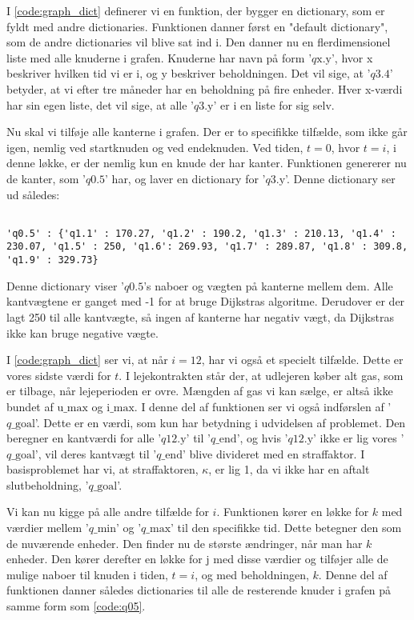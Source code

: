 I \autoref{code:graph_dict} definerer vi en funktion, der bygger en dictionary, som er fyldt med andre dictionaries. Funktionen danner først en "default dictionary", som de andre dictionaries vil blive sat ind i.
Den danner nu en flerdimensionel liste med alle knuderne i grafen. Knuderne har navn på form '$q\textrm{x.y}$', hvor x beskriver hvilken tid vi er i, og y beskriver beholdningen. Det vil sige, at '$q3.4$' betyder, at vi efter tre måneder har en beholdning på fire enheder. Hver x-værdi har sin egen liste, det vil sige, at alle '$q\textrm{3.y}$' er i en liste for sig selv.

Nu skal vi tilføje alle kanterne i grafen. Der er to specifikke tilfælde, som ikke går igen, nemlig ved startknuden og ved endeknuden. Ved tiden, $t=0$, hvor $t=i$, i denne løkke, er der nemlig kun en knude der har kanter. Funktionen genererer nu de kanter, som '$q\textrm{0.5}$' har, og laver en dictionary for '$q\textrm{3.y}$'. 
Denne dictionary ser ud således:

\begin{lstlisting}[label=code:q05, caption=Dictionary for $q \textrm{0.5}$.]

'q0.5' : {'q1.1' : 170.27, 'q1.2' : 190.2, 'q1.3' : 210.13, 'q1.4' : 230.07, 'q1.5' : 250, 'q1.6': 269.93, 'q1.7' : 289.87, 'q1.8' : 309.8, 'q1.9' : 329.73}
\end{lstlisting}
Denne dictionary viser '$q0.5$'s naboer og vægten på kanterne mellem dem. Alle kantvægtene er ganget med -1 for at bruge Dijkstras algoritme. Derudover er der lagt 250 til alle kantvægte, så ingen af kanterne har negativ vægt, da Dijkstras ikke kan bruge negative vægte. 

I \autoref{code:graph_dict} ser vi, at når $i=12$, har vi også et specielt tilfælde. Dette er vores sidste værdi for $t$. I lejekontrakten står der, at udlejeren køber alt gas, som er tilbage, når lejeperioden er ovre. Mængden af gas vi kan sælge, er altså ikke bundet af $\textrm{u\_max}$ og $\textrm{i\_max}$. I denne del af funktionen ser vi også indførslen af '$q\textrm{\_goal}$'. Dette er en værdi, som kun har betydning i udvidelsen af problemet. Den beregner  en kantværdi for alle '$q\textrm{12.y}$' til '$q\textrm{\_end}$', og hvis '$q\textrm{12.y}$' ikke er lig vores '$q\textrm{\_goal}$', vil deres kantvægt til '$q\textrm{\_end}$' blive divideret med en straffaktor. I basisproblemet har vi, at straffaktoren, $\kappa$, er lig 1, da vi ikke har en aftalt slutbeholdning, '$q\textrm{\_goal}$'.

Vi kan nu kigge på alle andre tilfælde for $i$. Funktionen kører en løkke for $k$ med værdier mellem '$q\textrm{\_min}$' og '$q\textrm{\_max}$' til den specifikke tid. Dette betegner den som de nuværende enheder.
Den finder nu de største ændringer, når man har $k$ enheder. Den kører derefter en løkke for $\textrm{j}$ med disse værdier og tilføjer alle de mulige naboer til knuden i tiden, $t=i$, og med beholdningen, $k$. Denne del af funktionen danner således dictionaries til alle de resterende knuder i grafen på samme form som \autoref{code:q05}.

